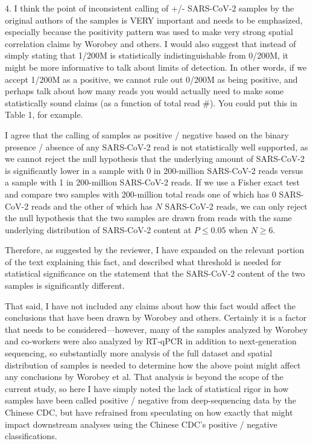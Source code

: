 \documentclass[11pt, oneside]{article}   	%
\newcommand{\response}[1]{{\color{black}#1}}
\begin{document}
4. I think the point of inconsistent calling of +/- SARS-CoV-2 samples by the original authors of the samples is VERY important and needs to be emphasized, especially because the positivity pattern was used to make very strong spatial correlation claims by Worobey and others. I would also suggest that instead of simply stating that 1/200M is statistically indistinguishable from 0/200M, it might be more informative to talk about limits of detection. In other words, if we accept 1/200M as a positive, we cannot rule out 0/200M as being positive, and perhaps talk about how many reads you would actually need to make some statistically sound claims (as a function of total read \#). You could put this in Table 1, for example.

\response{
I agree that the calling of samples as positive / negative based on the binary presence / absence of any SARS-CoV-2 read is not statistically well supported, as we cannot reject the null hypothesis that the underlying amount of SARS-CoV-2 is significantly lower in a sample with 0 in 200-million SARS-CoV-2 reads versus a sample with 1 in 200-million SARS-CoV-2 reads.
If we use a Fisher exact test and compare two samples with 200-million total reads one of which has 0 SARS-CoV-2 reads and the other of which has $N$ SARS-CoV-2 reads, we can only reject the null hypothesis that the two samples are drawn from reads with the same underlying distribution of SARS-CoV-2 content at $P \le 0.05$ when $N \ge 6$.

Therefore, as suggested by the reviewer, I have expanded on the relevant portion of the text explaining this fact, and described what threshold is needed for statistical significance on the statement that the SARS-CoV-2 content of the two samples is significantly different.

That said, I have not included any claims about how this fact would affect the conclusions that have been drawn by Worobey and others.
Certainly it is a factor that needs to be considered---however, many of the samples analyzed by Worobey and co-workers were also analyzed by RT-qPCR in addition to next-generation sequencing, so substantially more analysis of the full dataset and spatial distribution of samples is needed to determine how the above point might affect any conclusions by Worobey et al.
That analysis is beyond the scope of the current study, so here I have simply noted the lack of statistical rigor in how samples have been called positive / negative from deep-sequencing data by the Chinese CDC, but have refrained from speculating on how exactly that might impact downstream analyses using the Chinese CDC's positive / negative classifications.
}
\end{document}
